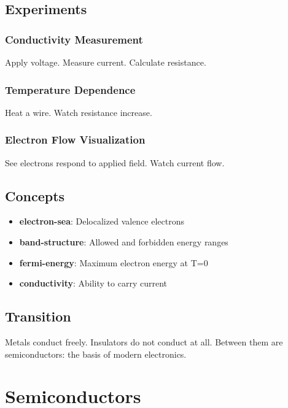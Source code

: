 \documentclass[
  11pt,
  letterpaper,
  twoside,
  openright]{book}
\providecommand{\tightlist}{%
  \setlength{\itemsep}{0pt}\setlength{\parskip}{0pt}}
\begin{document}
\section{Experiments}\label{experiments-12}

\subsection{Conductivity Measurement}\label{conductivity-measurement}

Apply voltage. Measure current. Calculate resistance.

\subsection{Temperature Dependence}\label{temperature-dependence-1}

Heat a wire. Watch resistance increase.

\subsection{Electron Flow
Visualization}\label{electron-flow-visualization}

See electrons respond to applied field. Watch current flow.

\section{Concepts}\label{concepts-12}

\begin{itemize}
\tightlist
\item
  \textbf{electron-sea}: Delocalized valence electrons
\item
  \textbf{band-structure}: Allowed and forbidden energy ranges
\item
  \textbf{fermi-energy}: Maximum electron energy at T=0
\item
  \textbf{conductivity}: Ability to carry current
\end{itemize}

\section{Transition}\label{transition-12}

Metals conduct freely. Insulators do not conduct at all. Between them
are semiconductors: the basis of modern electronics.

\chapter{Semiconductors}\label{sec-semiconductors}
\end{document}
